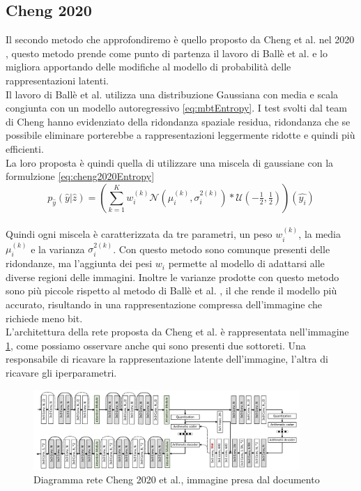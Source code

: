 \subsection{Cheng 2020}
Il secondo metodo che approfondiremo è quello proposto da Cheng et al. nel 2020 \cite{cheng2020learned}, questo metodo prende come punto di partenza il lavoro di Ballè et al. \cite{minnen2018joint} e lo migliora apportando delle modifiche al modello di probabilità delle rappresentazioni latenti.\\
Il lavoro di Ballè et al. \cite{minnen2018joint} utilizza una distribuzione Gaussiana con media e scala congiunta con un modello autoregressivo \ref{eq:mbtEntropy}. I test svolti dal team di Cheng hanno evidenziato della ridondanza spaziale residua, ridondanza che se possibile eliminare porterebbe a rappresentazioni leggermente ridotte e quindi più efficienti.\\
La loro proposta è quindi quella di utilizzare una miscela di gaussiane con la formulzione \ref{eq:cheng2020Entropy}
\begin{equation}\label{eq:cheng2020Entropy}
    p_{\hat{y}}(\hat{y}|\hat{z}) = (\sum_{k=1}^{K} w_{i}^{(k)} \mathcal{N}(\mu_{i}^{(k)},\sigma_{i}^{2(k)})*\mathcal{U}(-\tfrac{1}{2},\tfrac{1}{2}))(\hat{y_{i}})
\end{equation}\\
Quindi ogni miscela è caratterizzata da tre parametri, un peso $w_{i}^{(k)}$, la media $\mu_{i}^{(k)}$ e la varianza $\sigma_{i}^{2(k)}$.
Con questo metodo sono comunque presenti delle ridondanze, ma l’aggiunta dei pesi $w_{i}$ permette al modello di adattarsi alle diverse regioni delle immagini. Inoltre le varianze prodotte con questo metodo sono più piccole rispetto al metodo di Ballè et al. \cite{minnen2018joint}, il che rende il modello più accurato, risultando in una rappresentazione compressa dell’immagine che richiede meno bit.\\
L’architettura della rete proposta da Cheng et al. \cite{cheng2020learned} è rappresentata nell’immagine \ref{fig:cheng2020Network}, come possiamo osservare anche qui sono presenti due sottoreti. Una responsabile di ricavare la rappresentazione latente dell’immagine, l’altra di ricavare gli iperparametri.\\
\begin{figure}[!h]
    \centering
    \includegraphics[width=0.9\textwidth]{Immagini/Cheng2020_Rete.png}
    \caption{Diagramma rete Cheng 2020 et al., immagine presa dal documento \cite{cheng2020learned}}
    \label{fig:cheng2020Network}
\end{figure}\\
